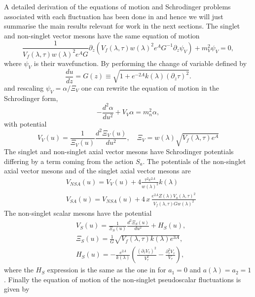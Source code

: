 \documentclass[a4paper,12pt]{article}
\begin{document}
A detailed derivation of the equations of motion and Schrodinger problems associated with each fluctuation has been done in \cite{Arean:2013tja} and hence we will just summarise the main results relevant for work in the next sections. 
The singlet and non-singlet vector mesons have the same equation of motion
\begin{equation}
\frac{1}{V_f(\lambda, \tau) w(\lambda)^2 e^A G} \partial_z (V_f(\lambda, \tau) w(\lambda)^2 e^A G^{-1} \partial_z \psi_V) + m_V^2 \psi_V = 0 ,
\end{equation}
where $\psi_V$ is their wavefunction. By performing the change of variable defined by
\begin{equation}
\frac{du}{dz} = G(z) \equiv \sqrt{1 + e^{-2A} k(\lambda) {\left( \partial_z \tau \right)}^2}.
\end{equation}
and rescaling $\psi_V = \alpha / \Xi_V$ one can rewrite the equation of motion in the Schrodinger form,
\begin{equation}
- \frac{d^2 \alpha}{d u^2} + V_V \alpha = m_n^2 \alpha,
\end{equation}
 with potential
\begin{equation}
V_V (u) = \frac{1}{\Xi_V (u)} \frac{d^2 \Xi_V (u)}{d u^2}, \quad \Xi_V = w (\lambda) \sqrt{V_f (\lambda, \tau) e^A}
\end{equation}
The singlet and non-singlet axial vector mesons have Schrodinger potentials differing by a term coming from the action $S_a$. The potentials of the non-singlet axial vector mesons and of the singlet axial vector mesons are
\begin{align}
&V_{NSA} (u) = V_V(u) + 4 \frac{\tau^2 e^{2 A}}{w(\lambda)^2} k(\lambda) \\
&V_{SA}(u) = V_{NSA} (u) + 4 \, x \, \frac{e^{2A}Z(\lambda)V_a(\lambda, \tau)^2}{V_f(\lambda,\tau) G w(\lambda)^2}
\end{align}
The non-singlet scalar mesons have the potential
\begin{align}
&V_S(u) = \frac{1}{\Xi_S(u)} \frac{d^2 \Xi_S(u)}{d u^2} + H_S (u), \\
&\Xi_S(u) = \frac{1}{G} \sqrt{V_f(\lambda, \tau) k(\lambda) e^{3A}}, \\
&H_S(u) =  - \frac{e^{2A}}{k(\lambda)} \left( \frac{(\partial_\tau V_\tau)^2}{V_\tau^2} - \frac{\partial_\tau^2 V_\tau}{V_\tau} \right),
\end{align}
where the $H_S$ expression is the same as the one in \cite{Arean:2013tja} for $a_1 = 0$ and $a(\lambda) =  a_2 = 1$.
Finally the equation of motion of the non-singlet pseudoscalar fluctuations is given by
\end{document}
